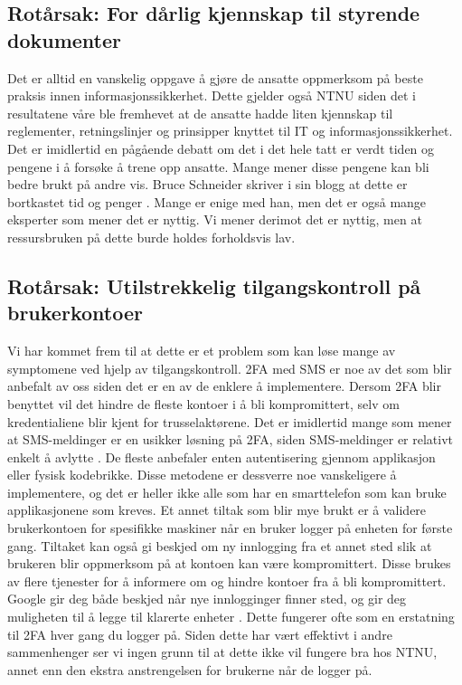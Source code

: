 \subsection*{Rotårsak: For dårlig kjennskap til styrende dokumenter}
Det er alltid en vanskelig oppgave å gjøre de ansatte oppmerksom på beste praksis innen informasjonssikkerhet. Dette gjelder også NTNU siden det i resultatene våre ble fremhevet at de ansatte hadde liten kjennskap til reglementer, retningslinjer og prinsipper knyttet til IT og informasjonssikkerhet. Det er imidlertid en pågående debatt om det i det hele tatt er verdt tiden og pengene i å forsøke å trene opp ansatte. Mange mener disse pengene kan bli bedre brukt på andre vis. Bruce Schneider skriver i sin blogg at dette er bortkastet tid og penger \cite{SecAware}. Mange er enige med han, men det er også mange eksperter som mener det er nyttig. Vi mener derimot det er nyttig, men at ressursbruken på dette burde holdes forholdsvis lav. 

\subsection*{Rotårsak: Utilstrekkelig tilgangskontroll på brukerkontoer}
Vi har kommet frem til at dette er et problem som kan løse mange av symptomene ved hjelp av tilgangskontroll. 2FA med SMS er noe av det som blir anbefalt av oss siden det er en av de enklere å implementere. Dersom 2FA blir benyttet vil det hindre de fleste kontoer i å bli kompromittert, selv om kredentialiene blir kjent for trusselaktørene. Det er imidlertid mange som mener at SMS-meldinger er en usikker løsning på 2FA, siden SMS-meldinger er relativt enkelt å avlytte \cite{2FA}. De fleste anbefaler enten autentisering gjennom applikasjon eller fysisk kodebrikke. Disse metodene er dessverre noe vanskeligere å implementere, og det er heller ikke alle som har en smarttelefon som kan bruke applikasjonene som kreves. Et annet tiltak som blir mye brukt er å validere brukerkontoen for spesifikke maskiner når en bruker logger på enheten for første gang. Tiltaket kan også gi beskjed om ny innlogging fra et annet sted slik at brukeren blir oppmerksom på at kontoen kan være kompromittert. Disse brukes av flere tjenester for å informere om og hindre kontoer fra å bli kompromittert. Google gir deg både beskjed når nye innlogginger finner sted, og gir deg muligheten til å legge til klarerte enheter \cite{trustcomp}. Dette fungerer ofte som en erstatning til 2FA hver gang du logger på. Siden dette har vært effektivt i andre sammenhenger ser vi ingen grunn til at dette ikke vil fungere bra hos NTNU, annet enn den ekstra anstrengelsen for brukerne når de logger på. 


